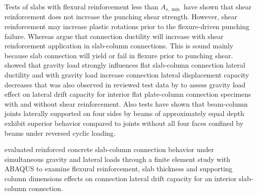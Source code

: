 Tests of slabs with flexural reinforcement less than $A_{s,\min{}}$ have shown that shear reinforcement does not increase the punching shear strength\citep{aci31819}. However, shear reinforcement may increase plastic rotations prior to the flexure-driven punching failure\citep{peiris2012flexural}. Whereas \cite{megally2000punching,kang2006,robertson2002cyclic} argue that connection ductility will increase with shear reinforcement application in slab-column connections. This is sound mainly because slab connection will yield or fail in flexure prior to punching shear. \cite{kang2006,megally2000punching,robertson1991,robertson1993,anggadjaja2008} showed that gravity load strongly influences flat slab-column connection lateral ductility and with gravity load increase connection lateral displacement capacity decreases that was also observed in reviewed test data by \cite{aci4212010} to assess gravity load effect on lateral drift capacity for interior flat plate-column connection specimens with and without shear reinforcement. Also tests have shown that beam-column joints laterally supported on four sides by beams of approximately equal depth exhibit superior behavior compared to joints without all four faces confined by beams under reversed cyclic loading\citep{hanson1967seismic}. 

\cite{najafgholipour2022} evaluated reinforced concrete slab-column connection behavior under simultaneous gravity and lateral loads through a finite element study with ABAQUS to examine flexural reinforcement, slab thickness and supporting column dimensions effects on connection lateral drift capacity for an interior slab-column connection.

